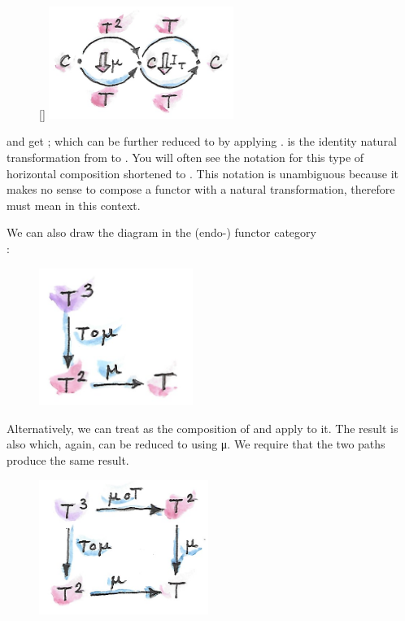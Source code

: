 \begin{figure}
\raisebox{0pt}[\dimexpr{}\baselineskip\relax]{
\includegraphics[width=60mm]{images/assoc1.png}}%
\end{figure}

\noindent
and get ; which can be further reduced to  by
applying .  is the identity natural transformation
from  to . You will often see the notation for this
type of horizontal composition  shortened to
. This notation is unambiguous because it makes no sense to
compose a functor with a natural transformation, therefore 
must mean  in this context.

We can also draw the diagram in the (endo-) functor category\\
\code{{[}C, C{]}}:

\begin{figure}[H]
\centering
\includegraphics[width=50mm]{images/assoc2.png}
\end{figure}

\noindent
Alternatively, we can treat  as the composition of
 and apply  to it. The result is also
 which, again, can be reduced to  using μ. We
require that the two paths produce the same result.

\begin{figure}[H]
\centering
\includegraphics[width=2.16667in]{images/assoc.png}
\end{figure}

